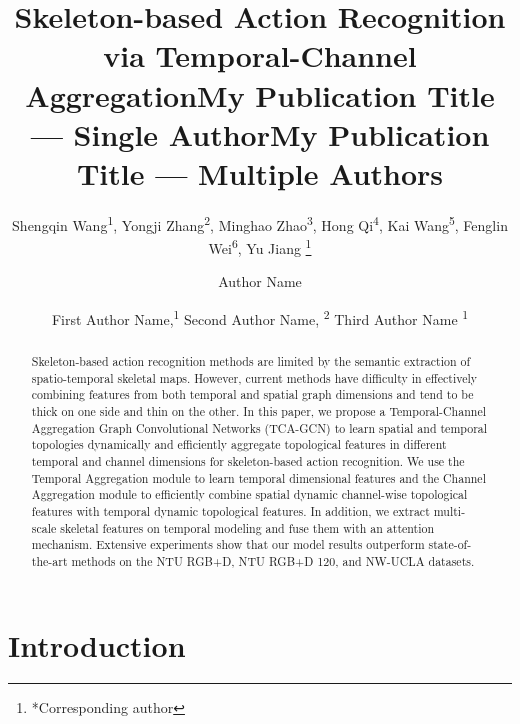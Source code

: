 \documentclass[letterpaper]{article} \usepackage[submission]{aaai23}  \usepackage{times}  \usepackage{helvet}  \usepackage{courier}  \usepackage[hyphens]{url}  \usepackage{graphicx} \urlstyle{rm} \def\UrlFont{\rm}  \usepackage{natbib}  \usepackage{caption} \frenchspacing  \setlength{\pdfpagewidth}{8.5in} \setlength{\pdfpageheight}{11in} \usepackage{algorithm}
\title{Skeleton-based Action Recognition via Temporal-Channel Aggregation}
\author{
Shengqin Wang\textsuperscript{\rm 1},
    Yongji Zhang\textsuperscript{\rm 2},
    Minghao Zhao\textsuperscript{\rm 3},
    Hong Qi\textsuperscript{\rm 4},
    Kai Wang\textsuperscript{\rm 5},
    Fenglin Wei\textsuperscript{\rm 6},
Yu Jiang \thanks{*Corresponding author}
}
\title{My Publication Title --- Single Author}
\author {
    Author Name
}
\title{My Publication Title --- Multiple Authors}
\author {
First Author Name,\textsuperscript{\rm 1}
    Second Author Name, \textsuperscript{\rm 2}
    Third Author Name \textsuperscript{\rm 1}
}
\begin{document}
\maketitle
\begin{abstract}
Skeleton-based action recognition methods are limited by the semantic extraction of spatio-temporal skeletal maps. However, current methods have difficulty in effectively combining features from both temporal and spatial graph dimensions and tend to be thick on one side and thin on the other. In this paper, we propose a Temporal-Channel Aggregation Graph Convolutional Networks (TCA-GCN) to learn spatial and temporal topologies dynamically and efficiently aggregate topological features in different temporal and channel dimensions for skeleton-based action recognition. We use the Temporal Aggregation module to learn temporal dimensional features and the Channel Aggregation module to efficiently combine spatial dynamic channel-wise topological features with temporal dynamic topological features. In addition, we extract multi-scale skeletal features on temporal modeling and fuse them with an attention mechanism. Extensive experiments show that our model results outperform state-of-the-art methods on the NTU RGB+D, NTU RGB+D 120, and NW-UCLA datasets.
\end{abstract}

\section{Introduction}
\end{document}
